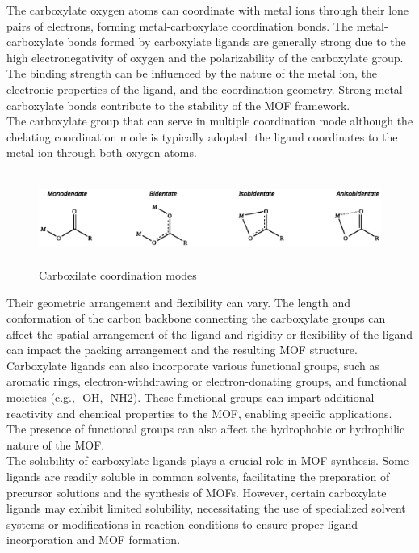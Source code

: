 \documentclass[../Master.tex]{subfiles}
\begin{document}
The carboxylate oxygen atoms can coordinate with metal ions through their lone pairs of electrons, forming metal-carboxylate coordination bonds. The metal-carboxylate bonds formed by carboxylate ligands are generally strong due to the high electronegativity of oxygen and the polarizability of the carboxylate group. The binding strength can be influenced by the nature of the metal ion, the electronic properties of the ligand, and the coordination geometry. Strong metal-carboxylate bonds contribute to the stability of the MOF framework. \\
The carboxylate group that can serve in multiple coordination mode although the chelating coordination mode is typically adopted: the ligand coordinates to the metal ion through both oxygen atoms.\\

\begin{figure}[h!]
	\centering
	\includegraphics[width=16cm,height=3cm,keepaspectratio]{Structures/carboxcordmode.eps}
	\caption{Carboxilate coordination modes}\label{fig:carboxcordmode}
\end{figure}

Their geometric arrangement and flexibility can vary. The length and conformation of the carbon backbone connecting the carboxylate groups can affect the spatial arrangement of the ligand and rigidity or flexibility of the ligand can impact the packing arrangement and the resulting MOF structure. \\
Carboxylate ligands can also incorporate various functional groups, such as aromatic rings, electron-withdrawing or electron-donating groups, and functional moieties (e.g., -OH, -NH2). These functional groups can impart additional reactivity and chemical properties to the MOF, enabling specific applications. The presence of functional groups can also affect the hydrophobic or hydrophilic nature of the MOF.\\
The solubility of carboxylate ligands plays a crucial role in MOF synthesis. Some ligands are readily soluble in common solvents, facilitating the preparation of precursor solutions and the synthesis of MOFs. However, certain carboxylate ligands may exhibit limited solubility, necessitating the use of specialized solvent systems or modifications in reaction conditions to ensure proper ligand incorporation and MOF formation.
\end{document}
